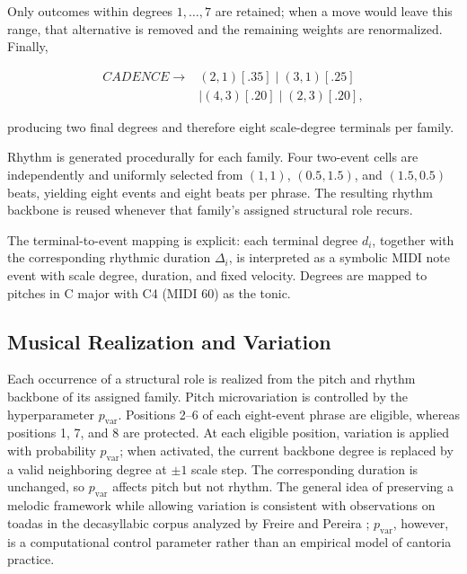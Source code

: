 \documentclass{article}
\begin{document}
Only outcomes within degrees \(1,\ldots,7\) are retained; when a move would leave this range, that alternative is removed and the remaining weights are renormalized. Finally,

\begin{equation}
\begin{aligned}
CADENCE\rightarrow{}&(2,1)[.35]\mid(3,1)[.25]\\
                    &\mid(4,3)[.20]\mid(2,3)[.20],
\end{aligned}
\end{equation}

producing two final degrees and therefore eight scale-degree terminals per family.

Rhythm is generated procedurally for each family. Four two-event cells are independently and uniformly selected from \((1,1)\), \((0.5,1.5)\), and \((1.5,0.5)\) beats, yielding eight events and eight beats per phrase. The resulting rhythm backbone is reused whenever that family's assigned structural role recurs.

The terminal-to-event mapping is explicit: each terminal degree \(d_i\), together with the corresponding rhythmic duration \(\Delta_i\), is interpreted as a symbolic MIDI note event with scale degree, duration, and fixed velocity. Degrees are mapped to pitches in C major with C4 (MIDI 60) as the tonic.

\subsection{Musical Realization and Variation}\label{subsec:realization}

Each occurrence of a structural role is realized from the pitch and rhythm backbone of its assigned family. Pitch microvariation is controlled by the hyperparameter \(p_{\mathrm{var}}\). Positions 2--6 of each eight-event phrase are eligible, whereas positions 1, 7, and 8 are protected. At each eligible position, variation is applied with probability \(p_{\mathrm{var}}\); when activated, the current backbone degree is replaced by a valid neighboring degree at \(\pm1\) scale step. The corresponding duration is unchanged, so \(p_{\mathrm{var}}\) affects pitch but not rhythm. The general idea of preserving a melodic framework while allowing variation is consistent with observations on toadas in the decasyllabic corpus analyzed by Freire and Pereira \cite{freire2019tratamento}; \(p_{\mathrm{var}}\), however, is a computational control parameter rather than an empirical model of cantoria practice.
\end{document}
